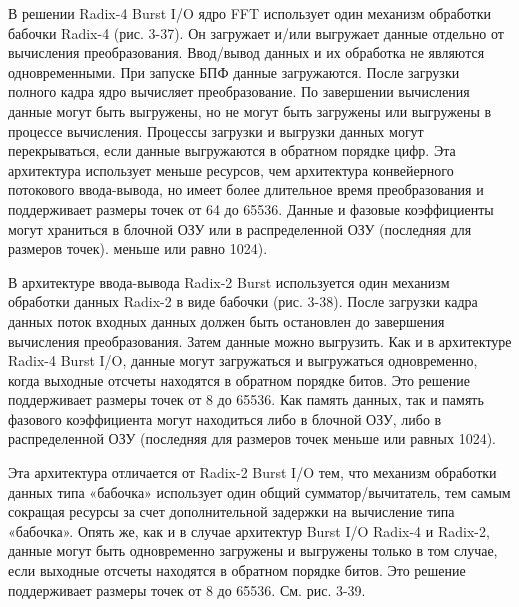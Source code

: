 В решении Radix-4 Burst I/O ядро FFT использует один механизм обработки бабочки Radix-4 (рис. 3-37). Он загружает и/или выгружает данные отдельно от вычисления преобразования. Ввод/вывод данных и их обработка не являются одновременными. При запуске БПФ данные загружаются. После загрузки полного кадра ядро вычисляет преобразование. По завершении вычисления данные могут быть выгружены, но не могут быть загружены или выгружены в процессе вычисления. Процессы загрузки и выгрузки данных могут перекрываться, если данные выгружаются в обратном порядке цифр. Эта архитектура использует меньше ресурсов, чем архитектура конвейерного потокового ввода-вывода, но имеет более длительное время преобразования и поддерживает размеры точек от 64 до 65536. Данные и фазовые коэффициенты могут храниться в блочной ОЗУ или в распределенной ОЗУ (последняя для размеров точек). меньше или равно 1024).

В архитектуре ввода-вывода Radix-2 Burst используется один механизм обработки данных Radix-2 в виде бабочки (рис. 3-38). После загрузки кадра данных поток входных данных должен быть остановлен до завершения вычисления преобразования. Затем данные можно выгрузить. Как и в архитектуре Radix-4 Burst I/O, данные могут загружаться и выгружаться одновременно, когда выходные отсчеты находятся в обратном порядке битов. Это решение поддерживает размеры точек от 8 до 65536. Как память данных, так и память фазового коэффициента могут находиться либо в блочной ОЗУ, либо в распределенной ОЗУ (последняя для размеров точек меньше или равных 1024).

Эта архитектура отличается от Radix-2 Burst I/O тем, что механизм обработки данных типа «бабочка» использует один общий сумматор/вычитатель, тем самым сокращая ресурсы за счет дополнительной задержки на вычисление типа «бабочка». Опять же, как и в случае архитектур Burst I/O Radix-4 и Radix-2, данные могут быть одновременно загружены и выгружены только в том случае, если выходные отсчеты находятся в обратном порядке битов. Это решение поддерживает размеры точек от 8 до 65536. См. рис. 3-39.

